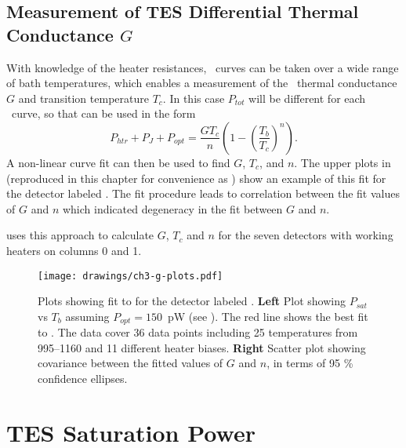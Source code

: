 \subsection{Measurement of \textsc{TES} Differential Thermal Conductance $G$}

With knowledge of the heater resistances, \IV\ curves can be taken over a wide range of bath temperatures, which enables a measurement of the \TES\ thermal conductance $G$ and transition temperature $T_c$.
In this case $P_{tot}$ will be different for each \IV\ curve, so that  can be used in the form
\begin{equation}\label{eqn:ch3-g-fit}
P_{htr} + P_J + P_{opt}= \frac{G T_c}{n}\left(1 - \left(\frac{T_b}{T_c}\right)^n\right).
\end{equation}
A non-linear curve fit can then be used to find $G$, $T_c$, and $n$.
The upper plots in  (reproduced in this chapter for convenience as ) show an example of this fit for the detector labeled .
The fit procedure leads to correlation between the fit values of $G$ and $n$ which indicated degeneracy in the fit between $G$ and $n$.

 uses this approach to calculate $G$, $T_c$ and $n$ for the seven detectors with working heaters on columns 0 and 1.

\begin{figure*}
\texttt{[image: drawings/ch3-g-plots.pdf]}
\caption[Plots showing fit to ]{
Plots showing fit to  for the detector labeled .
\textbf{Left} Plot showing $P_{sat}$ vs $T_b$ assuming $P_{opt} = 150$~pW (see ).
The red line shows the best fit to .
The data cover 36 data points including 25 temperatures from \SIrange{995}{1160}{\mK} and 11 different heater biases.
\textbf{Right} Scatter plot showing covariance between the fitted values of $G$ and $n$, in terms of 95 \% confidence ellipses.} 
\label{fig:ch3-g-plots}
\end{figure*}

\section{\textsc{TES} Saturation Power} \label{sec:ch3-psat}

